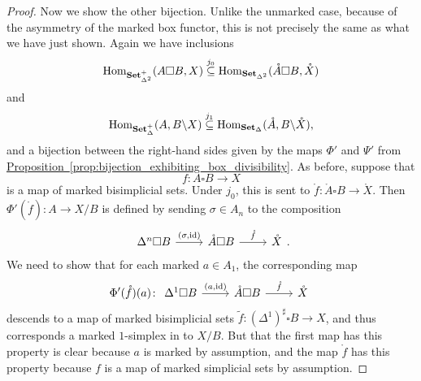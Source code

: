 \documentclass[main.tex]{subfiles}
\begin{document}
\begin{proof}
  Now we show the other bijection. Unlike the unmarked case, because of the asymmetry of the marked box functor, this is not precisely the same as what we have just shown. Again we have inclusions
  \begin{equation*}
    \mathrm{Hom}_{\mathbf{Set}_{\Delta^{2}}^{+}}(A \square B, X) \overset{j_{0}}{\subseteq} \mathrm{Hom}_{\mathbf{Set}_{\Delta^{2}}}(\mathring{A} \square B, \mathring{X})
  \end{equation*}
  and
  \begin{equation*}
    \mathrm{Hom}_{\mathbf{Set}_{\Delta}^{+}}(A, B \backslash X) \overset{j_{1}}{\subseteq} \mathrm{Hom}_{\mathbf{Set}_{\Delta}}(\mathring{A}, B \backslash \mathring{X}),
  \end{equation*}
  and a bijection between the right-hand sides given by the maps $\Phi'$ and $\Psi'$ from \hyperref[prop:bijection_exhibiting_box_divisibility]{Proposition~\ref*{prop:bijection_exhibiting_box_divisibility}}. As before, suppose that
  \begin{equation*}
    f\colon A \square B \to X
  \end{equation*}
  is a map of marked bisimplicial sets. Under $j_{0}$, this is sent to $\mathring{f}\colon \mathring{A} \square B \to \mathring{X}$. Then $\Phi'(\mathring{f})\colon A \to X / B$ is defined by sending $\sigma \in A_{n}$ to the composition
  \begin{equation*}
    \begin{tikzcd}
      \Delta^{n} \square B
      \arrow[r, "{(\sigma, \id)}"]
      & \mathring{A} \square B
      \arrow[r, "\mathring{f}"]
      & \mathring{X}
    \end{tikzcd}.
  \end{equation*}
  We need to show that for each marked $a \in A_{1}$, the corresponding map
  \begin{equation*}
    \Phi'(\mathring{f})(a)\colon 
    \begin{tikzcd}
      \Delta^{1} \square B
      \arrow[r, "{(a, \id)}"]
      & \mathring{A} \square B
      \arrow[r, "\mathring{f}"]
      & \mathring{X}
    \end{tikzcd}
  \end{equation*}
  descends to a map of marked bisimplicial sets $\tilde{f}\colon (\Delta^{1})^{\sharp} \square B \to X$, and thus corresponds a marked $1$-simplex in to $X / B$. But that the first map has this property is clear because $a$ is marked by assumption, and the map $\mathring{f}$ has this property because $f$ is a map of marked simplicial sets by assumption.


\end{proof}
\end{document}
